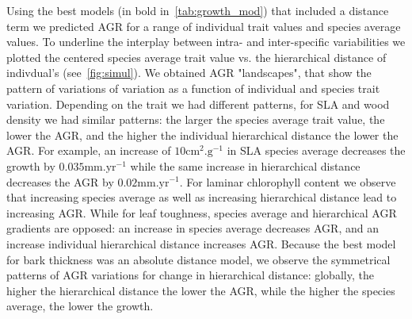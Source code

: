 Using the best models (in bold in~\autoref{tab:growth_mod}) that included a distance term we predicted AGR for a range of individual trait values and species average values. To underline the interplay between intra- and inter-specific variabilities we plotted the centered species average trait value vs. the hierarchical distance of indivdual's (see~\autoref{fig:simul}). We obtained AGR "landscapes", that show the pattern of variations of variation as a function of individual and species trait variation. Depending on the trait we had different patterns, for SLA and wood density we had similar patterns: the larger the species average trait value, the lower the AGR, and the higher the individual hierarchical distance the lower the AGR. For example, an increase of $10\text{cm}^2.\text{g}^{-1}$ in SLA species average decreases the growth by $0.035\text{mm}.\text{yr}^{-1}$ while the same increase in hierarchical distance decreases the AGR by $0.02\text{mm}.\text{yr}^{-1}$. For laminar chlorophyll content we observe that increasing species average as well as increasing hierarchical distance lead to increasing AGR. While for leaf toughness, species average and hierarchical AGR gradients are opposed: an increase in species average decreases AGR, and an increase individual hierarchical distance increases AGR. Because the best model for bark thickness was an absolute distance model, we observe the symmetrical patterns of AGR variations for change in hierarchical distance: globally, the higher the hierarchical distance the lower the AGR, while the higher the species average, the lower the growth.
